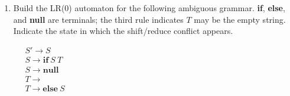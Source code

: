 \documentclass[twocolumn]{article}
\begin{document}
\begin{enumerate}
\item \begin{minipage}[t]{0.7\columnwidth}
 Build the LR(0) automaton for the following ambiguous grammar.
  \textbf{if}, \textbf{else}, and \textbf{null} are terminals; the
  third rule indicates $T$ may be the empty string.  Indicate the state
  in which the shift/reduce conflict appears.
\end{minipage}%
\begin{minipage}[t]{0.2\columnwidth}
\vspace{-0.8\baselineskip}
\ \
$
\begin{array}{l}
S' \rightarrow S \\
S \rightarrow \textbf{if}\ S\ T \\
S \rightarrow \textbf{null} \\
T \rightarrow \\
T \rightarrow \textbf{else}\ S
\end{array}
$
\end{minipage}

\def\pac{\ \cdot\ }
\newcommand{\id}{\textbf{Id}}

\end{enumerate}
\end{document}
